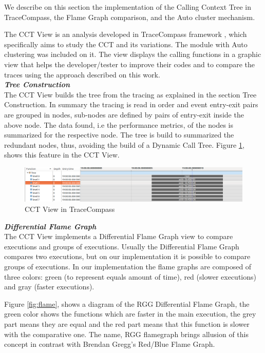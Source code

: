 We describe on this section the implementation of the Calling Context Tree in TraceCompass, the Flame Graph comparison, and the Auto cluster mechanism.

The CCT View is an analysis developed in TraceCompass framework \cite{tracecompass}, which specifically aims to study the CCT and its variations. The module with Auto clustering was included on it. The view displays the calling functions in a graphic view that helps the developer/tester to improve their codes and to compare the traces using the approach described on this work.\\

\textbf{\textit{Tree Construction}}\\
The CCT View builds the tree from the tracing as explained in the section Tree Construction. In summary the tracing is read in order and event entry-exit pairs are grouped in nodes, sub-nodes are defined by pairs of entry-exit inside the above node. The data found, i.e the performance metrics, of the nodes is summarized for the respective node. The tree is build to summarized the redundant nodes, thus, avoiding the build of a Dynamic Call Tree. Figure \ref{fig:cct_view}, shows this feature in the CCT View.\\
    
 \begin{figure}[h]
  \centering
    \includegraphics[width=1\columnwidth]{figures/cct_view.png}
    \caption{CCT View in TraceCompass }
    \label{fig:cct_view}
\end{figure}

\textbf{\textit{Differential Flame Graph}}\\
The CCT View implements a Differential Flame Graph view to compare executions and groups of executions. Usually the Differential Flame Graph compares two executions, but on our implementation it is possible to compare groups of executions. In our implementation the flame graphs are composed of three colors: green (to represent equals amount of time), red (slower executions) and gray (faster executions). 

Figure \ref{fig:flame}, shows a diagram of the RGG Differential Flame Graph, the green color shows the functions which are faster in the main execution, the grey part means they are equal and the red part means that this function is slower with the comparative one. The name, RGG flamegraph brings allusion of this concept in contrast with Brendan Gregg's Red/Blue Flame Graph. 
 

